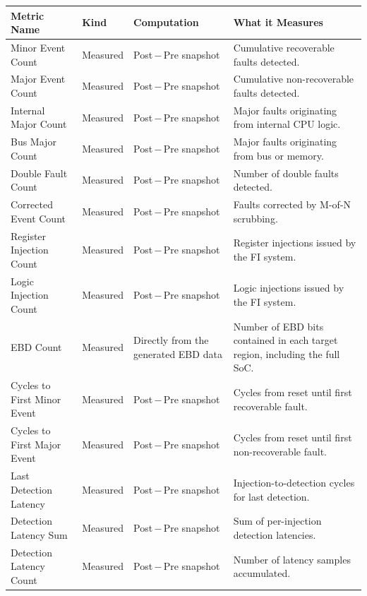 \begin{table}[h]
\centering
\small
\setlength{\tabcolsep}{3.2pt}
\renewcommand{\arraystretch}{1.25}
\begin{tabularx}{\textwidth}{|p{}|p{}|X|X|}
\hline
Metric Name &
Kind &
Computation &
What it Measures \\
\hline
\hline
Minor Event Count &
Measured &
Post\,$-$\,Pre snapshot &
Cumulative recoverable faults detected. \\
\hline
Major Event Count &
Measured &
Post\,$-$\,Pre snapshot &
Cumulative non-recoverable faults detected. \\
\hline
Internal Major Count &
Measured &
Post\,$-$\,Pre snapshot &
Major faults originating from internal CPU logic. \\
\hline
Bus Major Count &
Measured &
Post\,$-$\,Pre snapshot &
Major faults originating from bus or memory. \\
\hline
Double Fault Count &
Measured &
Post\,$-$\,Pre snapshot &
Number of double faults detected. \\
\hline
Corrected Event Count &
Measured &
Post\,$-$\,Pre snapshot &
Faults corrected by M-of-N scrubbing. \\
\hline
Register Injection Count &
Measured &
Post\,$-$\,Pre snapshot &
Register injections issued by the \ac{FI} system. \\
\hline
Logic Injection Count &
Measured &
Post\,$-$\,Pre snapshot &
Logic injections issued by the \ac{FI} system. \\
\hline
\ac{EBD} Count &
Measured &
Directly from the generated \ac{EBD} data &
Number of \ac{EBD} bits contained in each target region, including the full \ac{SoC}. \\
\hline
Cycles to First Minor Event &
Measured &
Post\,$-$\,Pre snapshot &
Cycles from reset until first recoverable fault. \\
\hline
Cycles to First Major Event &
Measured &
Post\,$-$\,Pre snapshot &
Cycles from reset until first non-recoverable fault. \\
\hline
Last Detection Latency &
Measured &
Post\,$-$\,Pre snapshot &
Injection-to-detection cycles for last detection. \\
\hline
Detection Latency Sum &
Measured &
Post\,$-$\,Pre snapshot &
Sum of per-injection detection latencies. \\
\hline
Detection Latency Count &
Measured &
Post\,$-$\,Pre snapshot &
Number of latency samples accumulated. \\
\hline

\end{tabularx}
\end{table}

